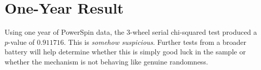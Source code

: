 \section{One-Year Result}
Using one year of PowerSpin data, the 3-wheel serial chi-squared test produced a
$p$-value of \(0.911716\).  This is \emph{somehow suspicious}. Further tests from a broader battery will help determine whether this
is simply good luck in the sample or whether the mechanism is not behaving like
genuine randomness.




